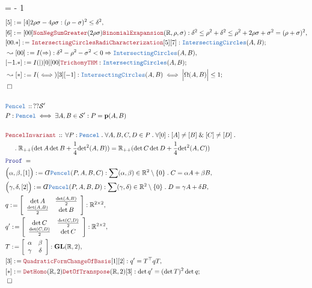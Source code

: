 \documentclass[12pt]{scrartcl}
\newcommand{\TYPE}[1]{\textcolor{NavyBlue}{\mathtt{#1}}}
\newcommand{\LOGIC}[1]{\textcolor{Blue}{\mathtt{#1}}}
\newcommand{\THM}[1]{\textcolor{Maroon}{\mathtt{#1}}}
\renewcommand{\.}{\; . \;}
\newcommand{\de}{: \kern 0.1pc =}
\newcommand{\Theorem}[2]{& \THM{#1} \, :: \, #2 \\ & \Proof = \\ }
\newcommand{\DeclareType}[2]{& \TYPE{#1} \, :: \, #2 \\}
\newcommand{\DefineType}[3]{& #1 : \TYPE{#2} \iff #3 \\}
\newcommand{\NewLine}{\\ & \kern 1pc}
\newcommand{\Page}[1]{ \begin{align*} #1 \end{align*}   }
\newcommand{ \bd }{ \ByDef }
\renewcommand{\And}{\; \& \;}
\newcommand{\Imply}{\Rightarrow}
\newcommand{\Reals}{\mathbb{R} }
\newcommand{\Say}[3]{& #1 \de #2 : #3, \\}
\newcommand{\Conclude}[3]{& #1 \de #2 : #3; \\}
\newcommand{\Derive}[3]{& \leadsto #1 \de #2 : #3, \\}
\newcommand{\DeriveConclude}[3]{& \leadsto #1 \de #2 : #3 ; \\}
\newcommand{\QED}{\; \square}
\newcommand{\EndProof}{& \QED \\}
\newcommand{\ByDef}{\rotatebox[origin=c]{-180}{$D$}}%
\newcommand{\Proof}{\LOGIC{Proof} \; }
\newcommand{\GL}{\mathbf{GL}}%
\renewcommand{\S}{\mathcal{S}}
\newcommand{\p}{\mathbf{p}}
\begin{document}
{{			 =
			  - 1
		}
}\Page{
		\Say{[5]}{[4] 2 \rho \sigma - 4 \rho \sigma}
		{
			(\rho - \sigma)^2  \le \delta^2    
		}
		\Say{[6]}{[00]\THM{NonNegSumGreater}(2\rho\sigma) \THM{BinomialExapansion}(\Reals,\rho,\sigma)  }{\delta^2 \le \rho^2 + \delta^2 \le \rho^2 +2\rho\sigma +  \sigma^2 = (\rho + \sigma)^2 }
		\Conclude{[00.*]}{\THM{IntersectingCirclesRadiCharacterization}[5][7]}
		{
			\TYPE{IntersectingCircles}(A,B)
		}
		\Derive{[00]}{I(\Imply)}{ \delta^2 - \rho^2 - \sigma^2 < 0  \Imply \TYPE{IntersectingCircles}(A,B)  }
		\Conclude{[-1.*]}{I(|)[0][00]\THM{TrichomyTHM}}{  \TYPE{IntersectingCircles}(A,B)    }
		\DeriveConclude{[*]}{I(\iff)[3][-1]}{ \TYPE{IntersectingCircles}(A,B) \iff \Big|  \Omega(A,B) \Big| \le 1}
		\EndProof
		\\
		\DeclareType{Pencel}{??\S'}
		\DefineType{P}{Pencel}{\exists A,B \in \S' : P = \p(A,B)}
		\\
		\Theorem{PencelInvariant}
		{
			\forall P : \TYPE{Pencel} \.
			\forall A,B,C,D \in P \.
			\forall [0] : [A] \neq [B] \And [C] \neq [D] \. \NewLine \. 
			\Reals_{++} (\det A \det B + \frac{1}{4}{\det}^2(A,B)) = 
			\Reals_{++} (\det C \det D + \frac{1}{4}{\det}^2(A,C))
		}
		\Say{\Big( \alpha,\beta, [1] \Big)}
		{
			\bd \TYPE{Pencel}(P,A,B,C)
		}
		{
			\sum (\alpha,\beta) \in \Reals^2 \setminus \{0\} \.
			C = \alpha A + \beta B
		}
		\Say{\Big( \gamma,\delta, [2] \Big)}
		{
			\bd \TYPE{Pencel}(P,A,B,D)
		}
		{
			\sum (\gamma,\delta) \in \Reals^2 \setminus \{0\} \.
			D = \gamma A + \delta B
		}
		\Say{q}{\left[\begin{array}{cc} \det A & \frac{\det(A,B)}{2} \\ \frac{\det(A,B)}{2} &  \det B  \end{array}\right]}
		{
			\Reals^{2 \times 2}
		}
		\Say{q'}{\left[\begin{array}{cc} \det C & \frac{\det(C,D)}{2} \\ \frac{\det(C,D)}{2} &  \det C  \end{array}\right]}
		{
			\Reals^{2 \times 2}
		}
		\Say{T}{\left[\begin{array}{cc} \alpha & \beta \\ \gamma &  \delta  \end{array}\right]}
		{\GL(\Reals,2) }
		\Say{[3]}{\THM{QuadraticFormChangeOfBasis}[1][2]}
		{
			q' =  T^\top q  T
		}
		\Conclude{[*]}{\THM{DetHomo}(\Reals,2)\THM{DetOfTranspose}(\Reals,2)[3]}{\det q' = (\det T)^2 \det q}
		\EndProof
		\\
}
\end{document}
